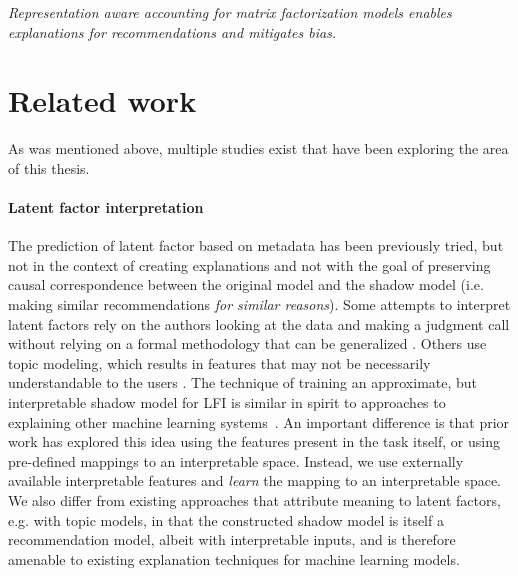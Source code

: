 \emph{Representation aware accounting for matrix factorization models enables
explanations for recommendations and mitigates bias.}

\section{Related work}

As was mentioned above, multiple studies exist that have been exploring the
area of this thesis.

\paragraph{Latent factor interpretation}
The prediction of latent factor based on metadata has been
previously tried\cite{gantner2010learning}, but not in the context of creating
explanations and not with the goal of preserving causal correspondence between
the original model and the shadow model (i.e. making similar recommendations
\emph{for similar reasons}). Some attempts to interpret latent
factors rely on the authors looking at the data and making a judgment call
without relying on a formal methodology that can be generalized
\cite{koren2009matrix}. Others use topic modeling, which results in features
that may not be necessarily understandable to the users
\cite{rossetti2013towards}. The technique of training an approximate, but
interpretable shadow
model for LFI is similar in spirit to approaches to explaining other
machine learning
systems~\cite{craven1995extracting,ribeiro2016lime,sanchez2015towards}.
An important difference is that prior work has explored this idea
using the features present in the task itself, or using pre-defined
mappings to an interpretable space. 
Instead, we use externally available interpretable features and
\emph{learn} the mapping to an interpretable space.
We also differ from existing approaches that attribute meaning to
latent factors, e.g.
with topic models\cite{rossetti2013towards}, in that the constructed
shadow model is itself a recommendation model, albeit with
interpretable inputs, and is therefore amenable to existing
explanation techniques for machine learning models.


